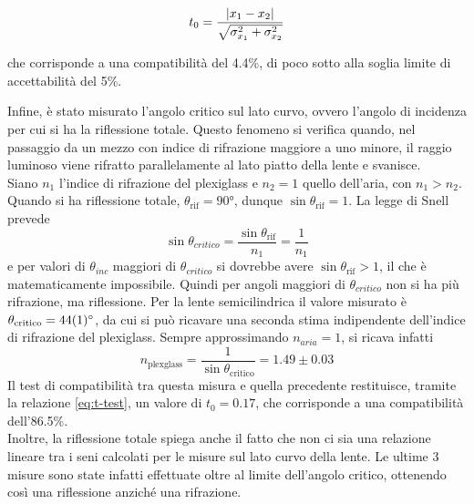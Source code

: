 \begin{equation}
    t_0 = \frac{\lvert x_1-x_2\rvert}{\sqrt{{\sigma}_{x_1}^2+{\sigma}_{x_2}^2}}
    \label{eq:t-test}
\end{equation} 

che corrisponde a una compatibilità del 4.4\%, di poco sotto alla soglia limite di accettabilità del 5\%.

Infine, è stato misurato l'angolo critico sul lato curvo, ovvero l'angolo di incidenza per cui si ha la riflessione totale. Questo fenomeno si verifica quando, nel passaggio da un mezzo con indice di rifrazione maggiore a uno 
minore, il raggio luminoso viene rifratto parallelamente al lato piatto della lente e svanisce.\\
Siano $n_1$ l'indice di rifrazione del plexiglass e $n_{2} = 1$ quello dell'aria, con $n_1>n_2$. Quando si ha riflessione totale, $\theta_{\text{rif}}=\ang{90}$, dunque $\sin\theta_{\text{rif}}=1$. La legge di Snell prevede $$\sin\theta_{critico}=\frac{\sin\theta_{\text{rif}}}{n_1}=\frac{1}{n_1}$$ e per valori di $\theta_{inc}$ maggiori di $\theta_{critico}$ si dovrebbe avere $\sin\theta_{\text{rif}}>1$, il che è matematicamente impossibile. Quindi per angoli maggiori di $\theta_{critico}$  non si ha più rifrazione, ma riflessione.
Per la lente semicilindrica il valore misurato è $\theta_{\text{critico}}=\qty{44 \pm 1}{\degree}$, da cui si può ricavare una seconda stima indipendente dell'indice di rifrazione del plexiglass. Sempre approssimando $n_{aria}=1$, si ricava infatti $$n_{\text{plexglass}} = \frac{1}{\sin\theta_{\text{critico}}} = 1.49 \pm 0.03 \label{misura-2}$$
Il test di compatibilità tra questa misura e quella precedente restituisce, tramite la relazione \eqref{eq:t-test}, un valore di $t_0=0.17$, che corrisponde a una compatibilità dell'86.5\%. \\
Inoltre, la riflessione totale spiega anche il fatto che non ci sia una relazione lineare tra i seni calcolati per le misure sul lato curvo della lente. Le ultime 3 misure sono state infatti 
effettuate oltre al limite dell'angolo critico, ottenendo così una riflessione anziché una rifrazione. 